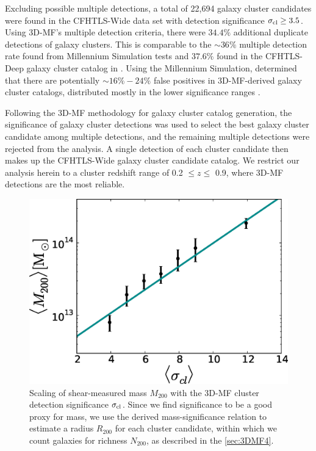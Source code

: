 Excluding possible multiple detections, a total of 22,694 galaxy cluster candidates were found in the \ac{CFHTLS}-Wide data set with detection significance $\sigma_{\rm cl} \ge 3.5$. Using \ac{3D-MF}'s multiple detection criteria, there were $34.4\%$ additional duplicate detections of galaxy clusters. This is comparable to the $\sim 36\%$ multiple detection rate found from Millennium Simulation tests and $37.6\%$ found in the \ac{CFHTLS}-Deep galaxy cluster catalog in \citet{Milkeraitis10}. Using the Millennium Simulation, \citet{Milkeraitis10} determined that there are potentially $\sim 16\%-24\%$ false positives in \ac{3D-MF}-derived galaxy cluster catalogs, distributed mostly in the lower significance ranges \citep[see Table~3 in][]{Milkeraitis10}.

Following the \ac{3D-MF} methodology for galaxy cluster catalog generation, the significance of galaxy cluster detections was used to select the best galaxy cluster candidate among multiple detections, and the remaining multiple detections were rejected from the analysis. A single detection of each cluster candidate then makes up the \ac{CFHTLS}-Wide galaxy cluster candidate catalog. We restrict our analysis herein to a cluster redshift range of 0.2 $\leq z \leq$ 0.9, where \ac{3D-MF} detections are the most reliable.

\begin{figure}
\begin{center}
  \includegraphics[scale=0.7]{plots_ch4/MassSig_relation.eps}
  \caption[Mass-Significance Relation]{Scaling of shear-measured mass $M_{200}$ with the \ac{3D-MF} cluster detection significance $\sigma_{\rm cl}$. Since we find significance to be a good proxy for mass, we use the derived mass-significance relation to estimate a radius $R_{200}$ for each cluster candidate, within which we count galaxies for richness $N_{200}$, as described in the \autoref{sec:3DMF4}.}
\label{plot:masssig4} %
\end{center}
\end{figure}

